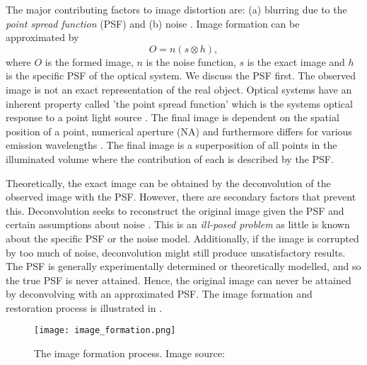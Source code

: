 \begin{definition}[Image distortion]
	The major contributing factors to image distortion are: (a) blurring due to the \textit{point spread function} (PSF) and (b) noise \citep{Sarder2006}.
	Image formation can be approximated by 
	\begin{equation}
		O = n(s \otimes h),
	\end{equation}
	where $O$ is the formed image, $n$ is the noise function, $s$ is the exact image and $h$ is the specific PSF of the optical system.
	We discuss the PSF first.
	The observed image is not an exact representation of the real object.
	Optical systems have an inherent property called 'the point spread function' which is the systems optical response to a point light source \citep{Danek2012}.
	The final image is dependent on the spatial position of a point, numerical aperture (NA) and furthermore differs for various emission wavelengths \citep{Hubeny2008,Keuper2012}.
	The final image is a superposition of all points in the illuminated volume where the contribution of each is described by the PSF.
	
	Theoretically, the exact image can be obtained by the deconvolution of the observed image with the PSF.
	However, there are secondary factors that prevent this.
	Deconvolution seeks to reconstruct the original image given the PSF and certain assumptions about noise \citep{Keuper2012}.
	This is an \textit{ill-posed problem} as little is known about the specific PSF or the noise model.
	Additionally, if the image is corrupted by too much of noise, deconvolution might still produce unsatisfactory results.
	The PSF is generally experimentally determined or theoretically modelled, and so the true PSF is never attained.
	Hence, the original image can never be attained by deconvolving with an approximated PSF.
	The image formation and restoration process is illustrated in .
	
	\begin{figure}[!t]
		\centering
		\texttt{[image: image\_formation.png]}
		\caption{The image formation process. Image source: \citep{cil:40968}}
		\label{fig:imageformation}
	\end{figure}
	

\end{definition}
